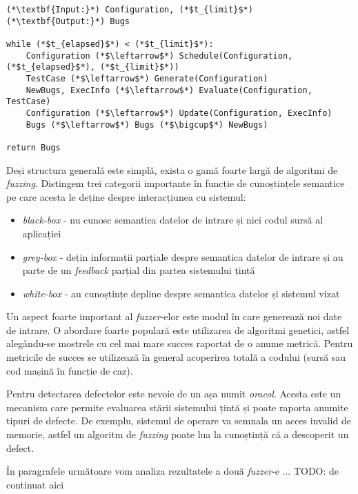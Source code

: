 \begin{lstlisting}[label={fuzzing_algo}, caption={Structura generală a unui algoritm de fuzzing}]
(*\textbf{Input:}*) Configuration, (*$t_{limit}$*)
(*\textbf{Output:}*) Bugs

while (*$t_{elapsed}$*) < (*$t_{limit}$*):
    Configuration (*$\leftarrow$*) Schedule(Configuration, (*$t_{elapsed}$*), (*$t_{limit}$*))
    TestCase (*$\leftarrow$*) Generate(Configuration)
    NewBugs, ExecInfo (*$\leftarrow$*) Evaluate(Configuration, TestCase)
    Configuration (*$\leftarrow$*) Update(Configuration, ExecInfo)
    Bugs (*$\leftarrow$*) Bugs (*$\bigcup$*) NewBugs)
    
return Bugs
\end{lstlisting}

Deși structura generală este simplă, exista o gamă foarte largă de algoritmi de \textit{fuzzing}. Distingem trei categorii importante în funcție de cunoștințele semantice pe care acesta le deține despre interacțiunea cu sistemul:

\begin{itemize}
    \item \textit{black-box} - nu cunosc semantica datelor de intrare și nici codul sursă al aplicației
    \item \textit{grey-box} - dețin informații parțiale despre semantica datelor de intrare și au parte de un \textit{feedback} parțial din partea sistemului țintă
    \item \textit{white-box} - au cunoștințe depline despre semantica datelor și sistemul vizat
\end{itemize}

Un aspect foarte important al \textit{fuzzer}-elor este modul în care generează noi date de intrare. O abordare foarte populară este utilizarea de algoritmi genetici, astfel alegându-se mostrele cu cel mai mare succes raportat de o anume metrică. Pentru metricile de succes se utilizează în general acoperirea totală a codului (sursă sau cod mașină în funcție de caz).

Pentru detectarea defectelor este nevoie de un așa numit \textit{oracol}. Acesta este un mecanism care permite evaluarea stării sistemului țintă și poate raporta anumite tipuri de defecte. De exemplu, sistemul de operare va semnala un acces invalid de memorie, astfel un algoritm de \textit{fuzzing} poate lua la cunoștință că a descoperit un defect.

În paragrafele următoare vom analiza rezultatele a două \textit{fuzzer}-e ... TODO: de continuat aici

